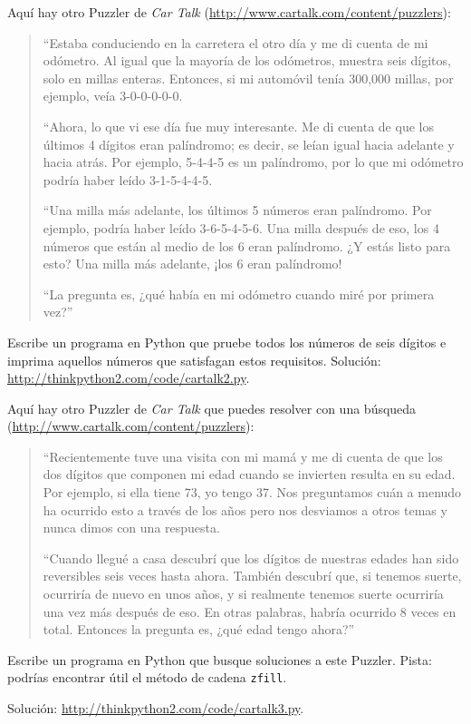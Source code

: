 \documentclass[10pt]{book}
\begin{document}
\begin{exercise}
Aquí hay otro Puzzler de {\em Car Talk}
(\url{http://www.cartalk.com/content/puzzlers}):

\begin{quote}
``Estaba conduciendo en la carretera el otro día y me di cuenta de
mi odómetro. Al igual que la mayoría de los odómetros, muestra seis dígitos,
solo en millas enteras. Entonces, si mi automóvil tenía 300,000
millas, por ejemplo, veía 3-0-0-0-0-0.

``Ahora, lo que vi ese día fue muy interesante. Me di cuenta de que los
últimos 4 dígitos eran palíndromo; es decir, se leían igual hacia adelante
y hacia atrás. Por ejemplo, 5-4-4-5 es un palíndromo, por lo que mi odómetro
podría haber leído 3-1-5-4-4-5.

``Una milla más adelante, los últimos 5 números eran palíndromo. Por ejemplo,
podría haber leído 3-6-5-4-5-6.  Una milla después de eso, los 4 números que están
al medio de los 6 eran palíndromo.  ¿Y estás listo para esto? Una milla más adelante,
¡los 6 eran palíndromo!

``La pregunta es, ¿qué había en mi odómetro cuando miré por primera vez?''
\end{quote}

Escribe un programa en Python que pruebe todos los números de seis dígitos e imprima
aquellos números que satisfagan estos requisitos.
Solución: \url{http://thinkpython2.com/code/cartalk2.py}.

\end{exercise}


\begin{exercise}
Aquí hay otro Puzzler de {\em Car Talk} que puedes resolver con una
búsqueda (\url{http://www.cartalk.com/content/puzzlers}):

\begin{quote}
``Recientemente tuve una visita con mi mamá y me di cuenta de que
los dos dígitos que componen mi edad cuando se invierten resulta en su
edad. Por ejemplo, si ella tiene 73, yo tengo 37. Nos preguntamos cuán a menudo ha
ocurrido esto a través de los años pero nos desviamos a otros temas y
nunca dimos con una respuesta.

``Cuando llegué a casa descubrí que los dígitos de nuestras edades han sido
reversibles seis veces hasta ahora. También descubrí que, si tenemos suerte,
ocurriría de nuevo en unos años, y si realmente tenemos suerte
ocurriría una vez más después de eso. En otras palabras, habría
ocurrido 8 veces en total. Entonces la pregunta es, ¿qué edad tengo ahora?''

\end{quote}

Escribe un programa en Python que busque soluciones a este Puzzler.
Pista: podrías encontrar útil el método de cadena {\tt zfill}.

Solución: \url{http://thinkpython2.com/code/cartalk3.py}.

\end{exercise}
\end{document}
